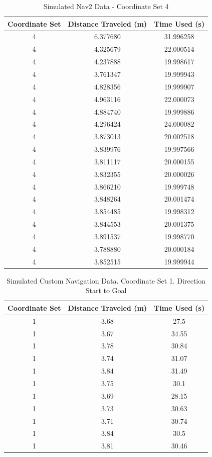 \documentclass[%
paper=A4,               %
twoside=true,           %
openright,              %
11pt,                   %
bibliography=totoc,     %
titlepage=on,           %
DIV=12,                 %
BCOR=1.5cm,             %
parskip=half,            %
final
]{scrreprt}
\begin{document}
	\begin{table}[h!]
		\centering
		\begin{tabular}{|c|c|c|}
			\hline
			Coordinate Set & Distance Traveled (m) & Time Used (s) \\
			\hline
			4 & 6.377680 & 31.996258 \\
			4 & 4.325679 & 22.000514 \\
			4 & 4.237888 & 19.998617 \\
			4 & 3.761347 & 19.999943 \\
			4 & 4.828356 & 19.999907 \\
			4 & 4.963116 & 22.000073 \\
			4 & 4.884740 & 19.999886 \\
			4 & 4.296424 & 24.000082 \\
			4 & 3.873013 & 20.002518 \\
			4 & 3.839976 & 19.997566 \\
			4 & 3.811117 & 20.000155 \\
			4 & 3.832355 & 20.000026 \\
			4 & 3.866210 & 19.999748 \\
			4 & 3.848264 & 20.001474 \\
			4 & 3.854485 & 19.998312 \\
			4 & 3.844553 & 20.001375 \\
			4 & 3.891537 & 19.998770 \\
			4 & 3.788880 & 20.000184 \\
			4 & 3.852515 & 19.999944 \\
			\hline
		\end{tabular}
		\caption{Simulated Nav2 Data - Coordinate Set 4}
		\label{tab:5}

	\end{table}
	
	

	\begin{table}[h!]
		\centering
		\begin{tabular}{|c|c|c|}
			\hline
			Coordinate Set & Distance Traveled (m)& Time Used (s) \\
			\hline
			1 & 3.68 & 27.5 \\
			1 & 3.67 & 34.55 \\
			1 & 3.78 & 30.84 \\
			1 & 3.74 & 31.07 \\
			1 & 3.84 & 31.49 \\
			1 & 3.75 & 30.1 \\
			1 & 3.69 & 28.15 \\
			1 & 3.73 & 30.63 \\
			1 & 3.71 & 30.74 \\
			1 & 3.84 & 30.5 \\
			1 & 3.81 & 30.46 \\
			\hline
		\end{tabular}
		\caption{Simulated Custom Navigation Data. Coordinate Set 1. Direction Start to Goal}
		\label{tab:start_to_goal_set1}
	\end{table}
	
\end{document}
